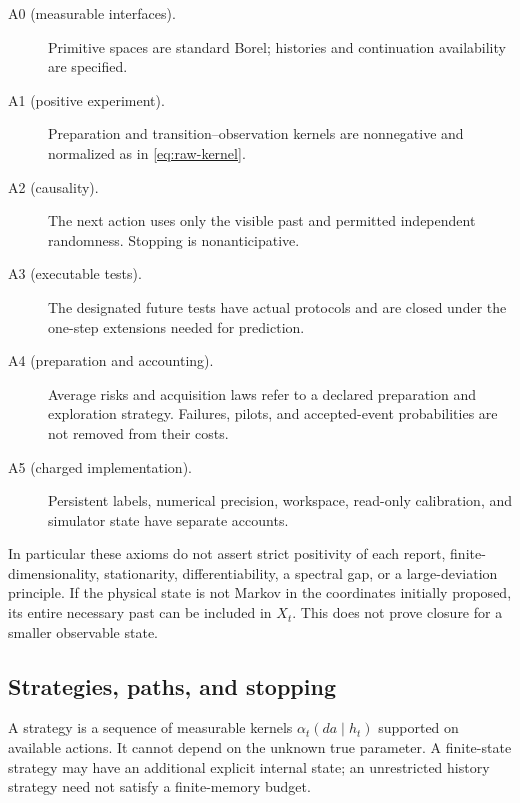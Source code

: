 \begin{description}
\item[A0 (measurable interfaces).] Primitive spaces are standard Borel;
histories and continuation availability are specified.
\item[A1 (positive experiment).] Preparation and transition--observation
kernels are nonnegative and normalized as in \eqref{eq:raw-kernel}.
\item[A2 (causality).] The next action uses only the visible past and
permitted independent randomness. Stopping is nonanticipative.
\item[A3 (executable tests).] The designated future tests have actual
protocols and are closed under the one-step extensions needed for prediction.
\item[A4 (preparation and accounting).] Average risks and acquisition laws
refer to a declared preparation and exploration strategy. Failures, pilots,
and accepted-event probabilities are not removed from their costs.
\item[A5 (charged implementation).] Persistent labels, numerical precision,
workspace, read-only calibration, and simulator state have separate accounts.
\end{description}

In particular these axioms do not assert strict positivity of each report,
finite-dimensionality, stationarity, differentiability, a spectral gap, or a
large-deviation principle. If the physical state is not Markov in the
coordinates initially proposed, its entire necessary past can be included in
$X_t$. This does not prove closure for a smaller observable state.

\subsection{Strategies, paths, and stopping}
A strategy is a sequence of measurable kernels
$\alpha_t(da\mid h_t)$ supported on available actions. It cannot depend on
the unknown true parameter. A finite-state strategy may have an additional
explicit internal state; an unrestricted history strategy need not satisfy a
finite-memory budget.

